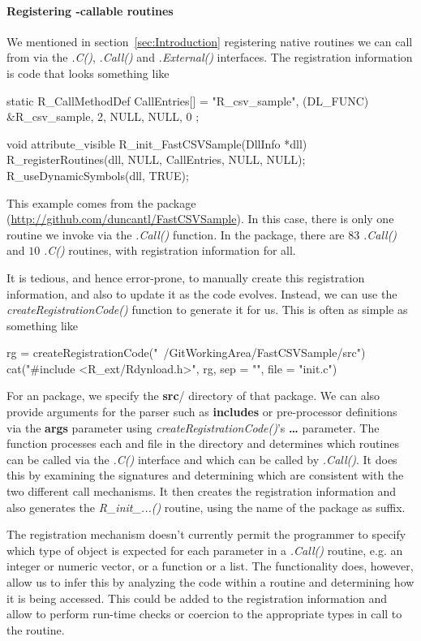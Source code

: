\documentclass[article]{jss}
\def\C{\proglang{C}}
\def\Cpp{\proglang{C$++$}}
\def\R{\proglang{R}}
\def\Rpkg#1{\pkg{#1}}
\def\Rfunc#1{\textsl{#1()}}
\def\Cfunc#1{\textit{#1()}}
\def\dir#1{\textbf{#1}/}
\def\Rarg#1{\textbf{#1}}
\begin{document}
\paragraph{Registering \R-callable routines}
We mentioned in section~\ref{sec:Introduction} registering native
routines we can call from \R{} via the \Rfunc{.C}, \Rfunc{.Call} and
\Rfunc{.External} interfaces.
The registration information is \C{} code that looks something like
\begin{CCode}
static R_CallMethodDef CallEntries[] = {
     {"R_csv_sample", (DL_FUNC) &R_csv_sample, 2},
     {NULL, NULL, 0}
};

void attribute_visible R_init_FastCSVSample(DllInfo *dll)
{
   R_registerRoutines(dll, NULL, CallEntries, NULL, NULL);
   R_useDynamicSymbols(dll, TRUE);
}  
\end{CCode}
This example comes from the \Rpkg{FastCSVSample} package
(\url{http://github.com/duncantl/FastCSVSample}). In this case, there
is only one \C{} routine we invoke via the \Rfunc{.Call} function.  In the
\Rpkg{stats} package, there are $83$ \Rfunc{.Call} and $10$ \Rfunc{.C}
routines, with registration information for all. 

It is tedious, and hence error-prone, to manually create this
registration information, and also to update it as the code evolves.
Instead, we can use the \Rfunc{createRegistrationCode} function to
generate it for us.  This is often as simple as something like
\begin{RCode}
rg = createRegistrationCode("~/GitWorkingArea/FastCSVSample/src")  
cat("#include <R_ext/Rdynload.h>", rg, sep = "\n", file = "init.c")
\end{RCode}
For an \R{} package, we specify the \dir{src} directory of that
package.  We can also provide arguments for the parser such as
\Rarg{includes} or pre-processor definitions via the \Rarg{args} parameter
using \Rfunc{createRegistrationCode}'s \Rarg{\dots} parameter.  The function processes each \C{} and \Cpp{}
file in the directory and determines which routines can be called via
the \Rfunc{.C} interface and which can be called by \Rfunc{.Call}.  It
does this by examining the signatures and determining which are
consistent with the two different call mechanisms.  It then creates the
registration information and also generates the \Cfunc{R_init_...}
routine, using the name of the package as suffix.

The \R{} registration mechanism doesn't currently permit the
programmer to specify which type of \R{} object is expected for each
parameter in a \Rfunc{.Call} routine, e.g. an integer or numeric
vector, or a function or a list.  The \Rpkg{RCIndex} functionality
does, however, allow us to infer this by analyzing the code within a
routine and determining how it is being accessed.  This could be added
to the registration information and allow \R{} to perform run-time
checks or coercion to the appropriate types in call to the routine.
\end{document}
